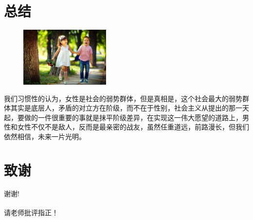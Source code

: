 \documentclass{beamer}
\begin{document}
	\section{总结}
	\begin{frame}
		\begin{figure}
			\centering
			\includegraphics[width=0.4\textwidth]{img/图片12.png}
		\end{figure}

		我们习惯性的认为，女性是社会的弱势群体，但是真相是，这个社会最大的弱势群体其实是底层人，矛盾的对立方在阶级，而不在于性别，社会主义从提出的那一天起，要做的一件很重要的事就是抹平阶级差异，在实现这一伟大愿望的道路上，男性和女性不仅不是敌人，反而是最亲密的战友，虽然任重道远，前路漫长，但我们依然相信，未来一片光明。
	\end{frame}
	
	\section*{致谢}  
	\begin{frame}
		\begin{center}
			\textcolor{myNewColorA}{\huge {谢谢!\\ \quad \\ 请老师批评指正！}}
		\end{center}
	\end{frame}
	
\end{document}
